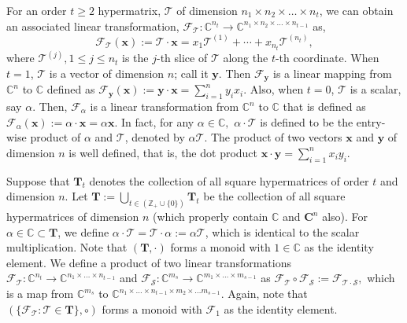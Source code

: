 \documentclass[10pt,a4paper]{article}
\begin{document}
	
	For an order $t \geq 2$ hypermatrix, $\mathcal{T}$ of dimension $n_1 \times n_2 \times \ldots \times n_t$, we can obtain an associated linear transformation, $\mathcal{F}_{\mathcal{T}}: \mathbb{C}^{n_t} \longrightarrow \mathbb{C}^{n_1 \times n_2 \times \ldots \times n_{t-1}}$ as, \begin{equation*} \mathcal{F}_{\mathcal{T}}(\mathbf{x}) := \mathcal{T} \cdot \mathbf{x} = x_1 \mathcal{T}^{(1)} + \cdots + x_{n_t} \mathcal{T}^{(n_t)}, \end{equation*} where $\mathcal{T}^{(j)}, 1 \leq j \leq n_t $ is the $j$-th slice of $\mathcal{T}$ along the $t$-th coordinate.  When $t=1$, $\mathcal{T}$ is a vector of dimension $n$; call it $\mathbf{y}$. Then $\mathcal{F}_{\mathbf{y}}$ is a linear mapping from $\mathbb{C}^n$ to $\mathbb{C}$ defined as $\mathcal{F}_{\mathbf{y}}(\mathbf{x}) := \mathbf{y} \cdot \mathbf{x} = \sum_{i=1}^n y_i x_i. $ Also, when $t=0$, $\mathcal{T}$ is a scalar, say $\alpha$. Then, $\mathcal{F}_{\alpha}$ is a linear transformation from $\mathbb{C}^n$ to $\mathbb{C}$ that is defined as $\mathcal{F}_{\alpha}(\mathbf{x}) := \alpha \cdot \mathbf{x} = \alpha \mathbf{x}.$ In fact, for any $\alpha \in \mathbb{C},$ $\alpha \cdot \mathcal{T}$ is defined to be the entry-wise product of $\alpha$ and $\mathcal{T}$, denoted by $\alpha \mathcal{T}. $ The product of two vectors $\mathbf{x}$ and $\mathbf{y}$ of dimension $n$ is well defined, that is, the dot product $\mathbf{x} \cdot \mathbf{y} = \sum_{i=1}^n x_iy_i$.
	
	Suppose that $\mathbf{T}_t$ denotes the collection of all square hypermatrices of order $t$ and dimension $n$. Let $\mathbf{T} := \bigcup_{t \in (\mathbb{Z}_+ \cup \{0\})} \mathbf{T}_t$ be the collection of all square hypermatrices of dimension $n$ (which properly contain $\mathbb{C}$ and $\mathbf{C}^n$ also). For $\alpha \in \mathbb{C} \subset \mathbf{T}$, we define $\alpha \cdot \mathcal{T}=\mathcal{T} \cdot \alpha := \alpha \mathcal{T}$, which is identical to the scalar multiplication. Note that $(\mathbf{T}, \cdot)$ forms a monoid with $1 \in \mathbb{C}$ as the identity element. We define a product of two linear transformations $\mathcal{F}_{\mathcal{T}}: \mathbb{C}^{n_t} \longrightarrow \mathbb{C}^{n_1 \times \ldots \times n_{t-1}} $ and $\mathcal{F}_{\mathcal{S}}: \mathbb{C}^{m_s} \longrightarrow \mathbb{C}^{m_1 \times \ldots \times m_{s-1}}$ as $\mathcal{F}_{\mathcal{T}} \circ \mathcal{F}_{\mathcal{S}} := \mathcal{F}_{\mathcal{T} \cdot \mathcal{S}},$ which is a map from $\mathbb{C}^{m_s}$ to $\mathbb{C}^{n_1 \times \ldots \times n_{t-1} \times m_2 \times \ldots m_{s-1}}.$ Again, note that $(\{\mathcal{F}_{\mathcal{T}}: \mathcal{T} \in \mathbf{T} \}, \circ)$ forms a monoid with $\mathcal{F}_1$ as the identity element. 
	
\end{document}
